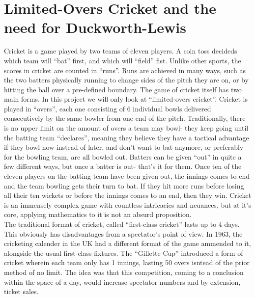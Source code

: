 \section{Limited-Overs Cricket and the need for Duckworth-Lewis}
Cricket is a game played by two teams of eleven players. A coin toss decideds which team will ``bat'' first, and which will ``field'' fist. Unlike other sports, the scores in cricket are counted in ``runs''. Runs are achieved
in many ways, such as the two batters physically running to change sides of the pitch they are on, or by hitting the ball over a pre-defined boundary. The game of cricket itself has two main forms. In this project we will 
only look at ``limited-overs cricket''. Cricket is played in ``overs'', each one consisting of 6 individual bowls delivered consecutively by the same bowler from one end of the pitch. Traditionally, there is no upper limit on the 
amount of overs a team may bowl- they keep going until the batting team ``declares'', meaning they believe they have a tactical advantage if they bowl now instead of later, and don't want to bat anymore, or preferably for the bowling team, are all bowled out. 
Batters can be given ``out'' in quite a few different ways, but once a batter is out- that's it for them. Once ten of the eleven players on the batting team have been given out, the innings comes to end and the team bowling 
gets their turn to bat. If they hit more runs before losing all their ten wickets or before the innings comes to an end, then they win. Cricket is an immensely complex game with countless intricacies and neuances, but at 
it's core, applying mathematics to it is not an absurd proposition. \\

The traditional format of cricket, called ``first-class cricket'' lasts up to 4 days. This obviously has disadvantages from a spectator's point of view. 
In 1963, the cricketing calender in the UK had a different format of the game ammended to it, alongside the usual first-class fixtures.
The ``Gillette Cup'' introduced a form of cricket wherein each team only has 1 innings, lasting 50 overs isntead of the prior method of no limit. The idea was 
that this competition, coming to a conclusion within the space of a day, would increase spectator numbers and by extension,
ticket sales.\\

